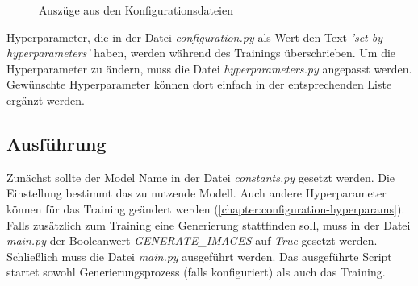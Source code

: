 \begin{figure}[H]
	\centering
	\qquad
	\caption{Auszüge aus den Konfigurationsdateien}
	\label{imgs:config-hyperparams}
\end{figure}

Hyperparameter, die in der Datei \textit{configuration.py} als Wert den Text \textit{'set by hyperparameters'} haben, werden während des Trainings überschrieben.
Um die Hyperparameter zu ändern, muss die Datei \textit{hyperparameters.py} angepasst werden.
Gewünschte Hyperparameter können dort einfach in der entsprechenden Liste ergänzt werden.

\subsection{Ausführung}
Zunächst sollte der Model Name in der Datei \textit{constants.py} gesetzt werden.
Die Einstellung bestimmt das zu nutzende Modell.
Auch andere Hyperparameter können für das Training geändert werden (\cref{chapter:configuration-hyperparams}).
Falls zusätzlich zum Training eine Generierung stattfinden soll, muss in der Datei \textit{main.py} der Booleanwert \textit{GENERATE\_IMAGES} auf \textit{True} gesetzt werden.
Schließlich muss die Datei \textit{main.py} ausgeführt werden.
Das ausgeführte Script startet sowohl Generierungsprozess (falls konfiguriert) als auch das Training.


